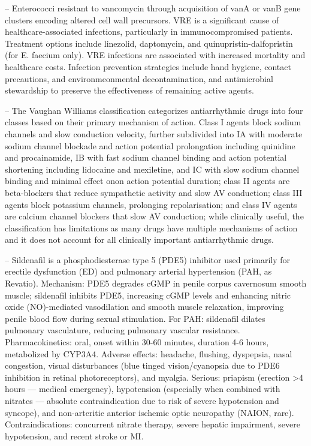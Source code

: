 -- Enterococci resistant to vancomycin through acquisition of vanA or vanB gene clusters encoding altered cell wall precursors. VRE is a significant cause of healthcare-associated infections, particularly in immunocompromised patients. Treatment options include linezolid, daptomycin, and quinupristin-dalfopristin (for E. faecium only). VRE infections are associated with increased mortality and healthcare costs. Infection prevention strategies include hand hygiene, contact precautions, and environmeonmental decontamination, and antimicrobial stewardship to preserve the effectiveness of remaining active agents.

-- The Vaughan Williams classification categorizes antiarrhythmic drugs into four classes based on their primary mechanism of action. Class I agents block sodium channels and slow conduction velocity, further subdivided into IA with moderate sodium channel blockade and action potential prolongation including quinidine and procainamide, IB with fast sodium channel binding and action potential shortening including lidocaine and mexiletine, and IC with slow sodium channel binding and minimal effect onon action potential duration; class II agents are beta-blockers that reduce sympathetic activity and slow AV conduction; class III agents block potassium channels, prolonging repolarisation; and class IV agents are calcium channel blockers that slow AV conduction; while clinically useful, the classification has limitations as many drugs have multiple mechanisms of action and it does not account for all clinically important antiarrhythmic drugs.

-- Sildenafil is a phosphodiesterase type 5 (PDE5) inhibitor used primarily for erectile dysfunction (ED) and pulmonary arterial hypertension (PAH, as Revatio). Mechanism: PDE5 degrades cGMP in penile corpus cavernosum smooth muscle; sildenafil inhibits PDE5, increasing cGMP levels and enhancing nitric oxide (NO)-mediated vasodilation and smooth muscle relaxation, improving penile blood flow during sexual stimulation. For PAH: sildenafil dilates pulmonary vasculature, reducing pulmonary vascular resistance. Pharmacokinetics: oral, onset within 30-60 minutes, duration 4-6 hours, metabolized by CYP3A4. Adverse effects: headache, flushing, dyspepsia, nasal congestion, visual disturbances (blue tinged vision/cyanopsia due to PDE6 inhibition in retinal photoreceptors), and myalgia. Serious: priapism (erection >4 hours — medical emergency), hypotension (especially when combined with nitrates — absolute contraindication due to risk of severe hypotension and syncope), and non-arteritic anterior ischemic optic neuropathy (NAION, rare). Contraindications: concurrent nitrate therapy, severe hepatic impairment, severe hypotension, and recent stroke or MI.

